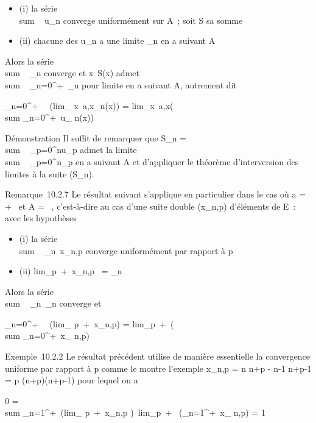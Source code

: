 \documentclass[]{article}
\begin{document}
\begin{itemize}
\itemsep1pt\parskip0pt
\item
  (i) la série \\sum ~
  u_n converge uniformément sur A~; soit S sa somme
\item
  (ii) chacune des u_n a une limite \ell_n en a suivant A
\end{itemize}

Alors la série \\sum ~
\ell_n converge et x\mapsto~S(x) admet
\\sum ~
_n=0^+\infty~\ell_n pour limite en a suivant A, autrement
dit

\sum _n=0^+\infty~~\left
(lim_ x\rightarrow~a,x\inAu_n(x)\right ) =
lim_x\rightarrow~a,x\inA\left (\\sum
_n=0^+\infty~u_ n(x)\right )

Démonstration Il suffit de remarquer que S_n
= \\sum ~
_p=0^nu_p admet la limite
\\sum ~
_p=0^n\ell_p en a suivant A et d'appliquer le
théorème d'interversion des limites à la suite (S_n).

Remarque~10.2.7 Le résultat suivant s'applique en particulier dans le
cas où a = +\infty~ et A = ~, c'est-à-dire au cas d'une suite double
(x_n,p) d'éléments de E~: avec les hypothèses

\begin{itemize}
\itemsep1pt\parskip0pt
\item
  (i) la série \\sum ~
  _n\in{}~x_n,p converge uniformément par rapport à p
\item
  (ii) lim_p\rightarrow~+\infty~x_n,p~ =
  \ell_n
\end{itemize}

Alors la série \\sum ~
_n\in{}~\ell_n converge et

\sum _n=0^+\infty~~\left
(lim_ p\rightarrow~+\infty~x_n,p\right ) =
lim_p\rightarrow~+\infty~\left (\\sum
_n=0^+\infty~x_ n,p\right )

Exemple~10.2.2 Le résultat précédent utilise de manière essentielle la
convergence uniforme par rapport à p comme le montre l'exemple
x_n,p = n \over n+p - n-1
\over n+p-1 = p \over (n+p)(n+p-1)
pour lequel on a

0 = \\sum
_n=1^+\infty~\left (lim_
p\rightarrow~+\infty~x_n,p\right
)\neq~lim_p\rightarrow~+\infty~\left
(\sum _n=1^+\infty~x_
n,p\right ) = 1
\end{document}
